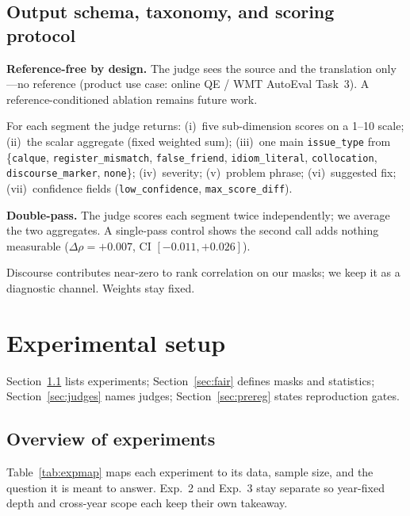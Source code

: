 \documentclass[11pt]{article}
\begin{document}
\subsection{Output schema, taxonomy, and scoring protocol}
\textbf{Reference-free by design.}
The judge sees the source and the translation only---no reference
(product use case: online QE / WMT AutoEval Task~3).
A reference-conditioned ablation remains future work.

For each segment the judge returns:
(i)~five sub-dimension scores on a 1--10 scale;
(ii)~the scalar aggregate (fixed weighted sum);
(iii)~one main \texttt{issue\_type} from
\{\texttt{calque}, \texttt{register\_mismatch}, \texttt{false\_friend},
\texttt{idiom\_literal}, \texttt{collocation}, \texttt{discourse\_marker},
\texttt{none}\};
(iv)~severity; (v)~problem phrase; (vi)~suggested fix;
(vii)~confidence fields (\texttt{low\_confidence}, \texttt{max\_score\_diff}).

\textbf{Double-pass.}
The judge scores each segment twice independently; we average the two aggregates.
A single-pass control shows the second call adds nothing measurable
($\Delta\rho{=}{+}0.007$, CI $[{-}0.011,{+}0.026]$).

Discourse contributes near-zero to rank correlation on our masks; we keep it as
a diagnostic channel. Weights stay fixed.

\section{Experimental setup}
\label{sec:setup}
Section~\ref{sec:expmap} lists experiments; Section~\ref{sec:fair} defines masks
and statistics; Section~\ref{sec:judges} names judges;
Section~\ref{sec:prereg} states reproduction gates.

\subsection{Overview of experiments}
\label{sec:expmap}
Table~\ref{tab:expmap} maps each experiment to its data, sample size, and the
question it is meant to answer.
Exp.~2 and Exp.~3 stay separate so year-fixed depth and cross-year scope each
keep their own takeaway.
\end{document}
